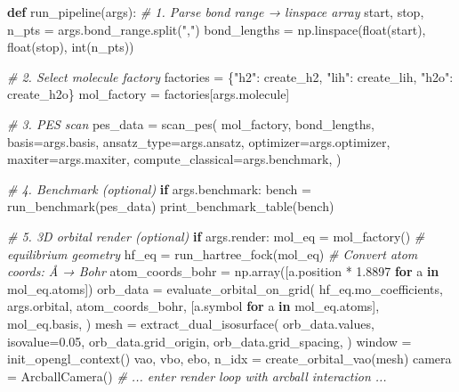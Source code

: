 \documentclass[
  11pt,
]{report}
\newenvironment{Shaded}{}{}
\newcommand{\BuiltInTok}[1]{\textcolor[rgb]{0.00,0.50,0.00}{#1}}
\newcommand{\CommentTok}[1]{\textcolor[rgb]{0.38,0.63,0.69}{\textit{#1}}}
\newcommand{\ControlFlowTok}[1]{\textcolor[rgb]{0.00,0.44,0.13}{\textbf{#1}}}
\newcommand{\FloatTok}[1]{\textcolor[rgb]{0.25,0.63,0.44}{#1}}
\newcommand{\KeywordTok}[1]{\textcolor[rgb]{0.00,0.44,0.13}{\textbf{#1}}}
\newcommand{\NormalTok}[1]{#1}
\newcommand{\OperatorTok}[1]{\textcolor[rgb]{0.40,0.40,0.40}{#1}}
\newcommand{\StringTok}[1]{\textcolor[rgb]{0.25,0.44,0.63}{#1}}
\begin{document}
\begin{Shaded}
\begin{Highlighting}[]
\KeywordTok{def}\NormalTok{ run\_pipeline(args):}
    \CommentTok{\# 1. Parse bond range → linspace array}
\NormalTok{    start, stop, n\_pts }\OperatorTok{=}\NormalTok{ args.bond\_range.split(}\StringTok{","}\NormalTok{)}
\NormalTok{    bond\_lengths }\OperatorTok{=}\NormalTok{ np.linspace(}\BuiltInTok{float}\NormalTok{(start), }\BuiltInTok{float}\NormalTok{(stop), }\BuiltInTok{int}\NormalTok{(n\_pts))}

    \CommentTok{\# 2. Select molecule factory}
\NormalTok{    factories }\OperatorTok{=}\NormalTok{ \{}\StringTok{"h2"}\NormalTok{: create\_h2, }\StringTok{"lih"}\NormalTok{: create\_lih, }\StringTok{"h2o"}\NormalTok{: create\_h2o\}}
\NormalTok{    mol\_factory }\OperatorTok{=}\NormalTok{ factories[args.molecule]}

    \CommentTok{\# 3. PES scan}
\NormalTok{    pes\_data }\OperatorTok{=}\NormalTok{ scan\_pes(}
\NormalTok{        mol\_factory, bond\_lengths,}
\NormalTok{        basis}\OperatorTok{=}\NormalTok{args.basis, ansatz\_type}\OperatorTok{=}\NormalTok{args.ansatz,}
\NormalTok{        optimizer}\OperatorTok{=}\NormalTok{args.optimizer, maxiter}\OperatorTok{=}\NormalTok{args.maxiter,}
\NormalTok{        compute\_classical}\OperatorTok{=}\NormalTok{args.benchmark,}
\NormalTok{    )}

    \CommentTok{\# 4. Benchmark (optional)}
    \ControlFlowTok{if}\NormalTok{ args.benchmark:}
\NormalTok{        bench }\OperatorTok{=}\NormalTok{ run\_benchmark(pes\_data)}
\NormalTok{        print\_benchmark\_table(bench)}

    \CommentTok{\# 5. 3D orbital render (optional)}
    \ControlFlowTok{if}\NormalTok{ args.render:}
\NormalTok{        mol\_eq }\OperatorTok{=}\NormalTok{ mol\_factory()               }\CommentTok{\# equilibrium geometry}
\NormalTok{        hf\_eq }\OperatorTok{=}\NormalTok{ run\_hartree\_fock(mol\_eq)}
        \CommentTok{\# Convert atom coords: Å → Bohr}
\NormalTok{        atom\_coords\_bohr }\OperatorTok{=}\NormalTok{ np.array([a.position }\OperatorTok{*} \FloatTok{1.8897} \ControlFlowTok{for}\NormalTok{ a }\KeywordTok{in}\NormalTok{ mol\_eq.atoms])}
\NormalTok{        orb\_data }\OperatorTok{=}\NormalTok{ evaluate\_orbital\_on\_grid(}
\NormalTok{            hf\_eq.mo\_coefficients, args.orbital,}
\NormalTok{            atom\_coords\_bohr, [a.symbol }\ControlFlowTok{for}\NormalTok{ a }\KeywordTok{in}\NormalTok{ mol\_eq.atoms],}
\NormalTok{            mol\_eq.basis,}
\NormalTok{        )}
\NormalTok{        mesh }\OperatorTok{=}\NormalTok{ extract\_dual\_isosurface(}
\NormalTok{            orb\_data.values, isovalue}\OperatorTok{=}\FloatTok{0.05}\NormalTok{,}
\NormalTok{            orb\_data.grid\_origin, orb\_data.grid\_spacing,}
\NormalTok{        )}
\NormalTok{        window }\OperatorTok{=}\NormalTok{ init\_opengl\_context()}
\NormalTok{        vao, vbo, ebo, n\_idx }\OperatorTok{=}\NormalTok{ create\_orbital\_vao(mesh)}
\NormalTok{        camera }\OperatorTok{=}\NormalTok{ ArcballCamera()}
        \CommentTok{\# ... enter render loop with arcball interaction ...}


\end{Highlighting}
\end{Shaded}
\end{document}
